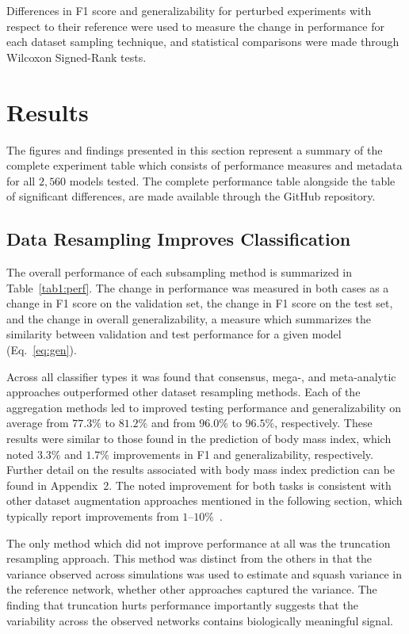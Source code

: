\documentclass[10pt]{SelfArx} %
\newcommand{\new}[1]{\color{blue}#1\color{black}\xspace}
\begin{document}
Differences in F1 score and generalizability for perturbed experiments with respect to their reference were used to
measure the change in performance for each dataset sampling technique, and statistical comparisons were made
through Wilcoxon Signed-Rank tests.


\section*{Results}

The figures and findings presented in this section represent a summary of the complete experiment table which consists
of performance measures and metadata for all $2,560$ models tested. The complete performance table alongside the table
of significant differences, are made available through the GitHub repository.

\subsection*{Data Resampling Improves Classification}

The overall performance of each subsampling method is summarized in Table~\ref{tab1:perf}. The change in performance
was measured in both cases as a change in F1 score on the validation set, the change in F1 score on the test set, and
the change in overall generalizability, a measure which summarizes the similarity between validation and test
performance for a given model \new{(Eq.~\ref{eq:gen})}.

Across all classifier types it was found that consensus, mega-, and meta-analytic approaches outperformed other dataset
resampling methods. \new{Each of the aggregation methods led to improved testing performance and generalizability on
average from $77.3\%$ to $81.2\%$ and from $96.0\%$ to $96.5\%$, respectively. These results were similar to those
found in the prediction of body mass index, which noted $3.3\%$ and $1.7\%$ improvements in F1 and generalizability,
respectively. Further detail on the results associated with body mass index prediction can be found in Appendix~2.
The noted improvement for both tasks is consistent with other dataset augmentation approaches mentioned in the
following section, which typically report improvements from $1–10\%$~\cite{shorten2019survey}.}

The only method which did not improve performance at all was the truncation resampling approach. This method was
distinct from the others in that the variance observed across
simulations was used to estimate and squash variance in the reference network, whether other approaches captured the
variance. The finding that truncation hurts performance importantly suggests that the variability across the observed
networks contains biologically meaningful signal.
\end{document}
